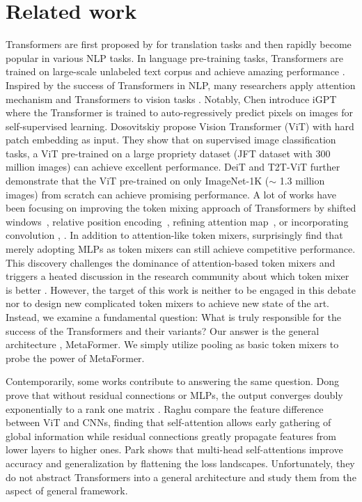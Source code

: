 \section{Related work}
Transformers are first proposed by \cite{transformer} for translation tasks and then rapidly become popular in various NLP tasks. 
In language pre-training tasks, Transformers are trained on large-scale unlabeled text corpus and achieve amazing performance \cite{bert, gpt3}. 
Inspired by the success of Transformers in NLP, many researchers apply attention mechanism and Transformers to vision tasks \cite{double_attention, stand_alone_attention, vaswani2021scaling, detr}. Notably, Chen \etal introduce iGPT \cite{igpt} where the Transformer is trained to auto-regressively predict pixels on images for self-supervised learning. Dosovitskiy \etal propose Vision Transformer (ViT) with hard patch embedding as input\cite{vit}. They show that on supervised image classification tasks, a ViT pre-trained on a large propriety dataset (JFT dataset with 300 million images) can achieve excellent performance. DeiT \cite{deit} and T2T-ViT \cite{t2t} further demonstrate that the ViT pre-trained on only ImageNet-1K ($\sim$ 1.3 million images) from scratch can achieve promising performance. A lot of works have been focusing on improving the token mixing approach of Transformers by shifted windows~\cite{swin}, relative position encoding~\cite{wu2021rethinking}, refining attention map~\cite{refiner}, or incorporating convolution \cite{guo2021cmt, wu2021cvt, d2021convit}, \etc. In addition to attention-like token mixers, \cite{mlp-mixer, resmlp} surprisingly find that merely adopting MLPs as token mixers can still achieve competitive performance. This discovery challenges the dominance of attention-based token mixers and triggers a heated discussion in the research community about which token mixer is better \cite{vip, chen2021cyclemlp}. However, the target of this work is neither to be engaged in this debate nor to design new complicated token mixers to achieve new state of the art. Instead, we examine a fundamental question: What is truly responsible for the success of the Transformers and their variants? Our answer is the general architecture \ie, MetaFormer. We simply utilize pooling as basic token mixers to probe the power of MetaFormer.

Contemporarily, some works contribute to answering the same question. Dong \etal prove that without residual connections or MLPs, the output converges doubly exponentially to a rank one matrix \cite{dong2021attention}. Raghu \etal \cite{raghu2021vision} compare the feature difference between ViT and CNNs, finding that self-attention allows early gathering of global information while residual connections greatly propagate features from lower layers to higher ones. Park \etal \cite{park2022how} shows that multi-head self-attentions improve accuracy and generalization by flattening the loss landscapes. Unfortunately, they do not abstract Transformers into a general architecture and study them from the aspect of general framework.